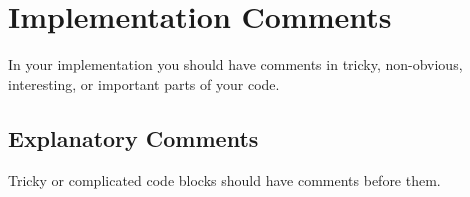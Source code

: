 
\section{Implementation Comments}\label{sec:implementation-comments}
In your implementation you should have comments in tricky, non-obvious, interesting, or important parts of your code.

    \subsection{Explanatory Comments}
    Tricky or complicated code blocks should have comments before them.